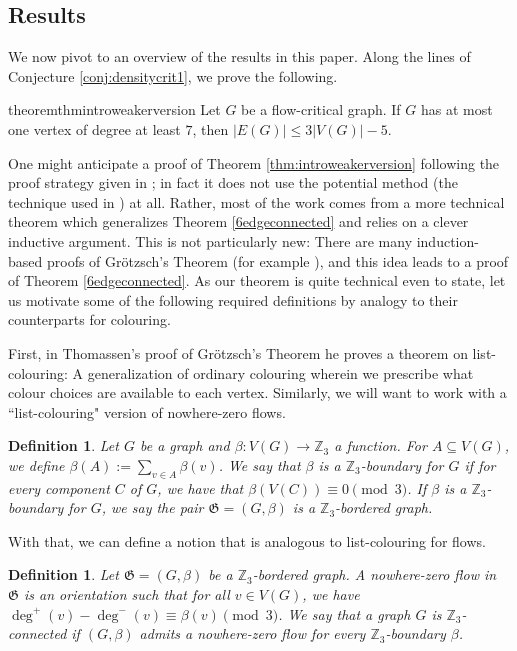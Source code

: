 \documentclass{article}
\newcommand{\Z}{\mathbb{Z}_3}
\newcommand\g{\mathfrak{G}}
\newtheorem{definition}[theorem]{Definition}
\begin{document}
\subsection{Results}\label{subsec:results}
We now pivot to an overview of the results in this paper. Along the lines of Conjecture \ref{conj:densitycrit1}, we prove the following.
\begin{restatable}{theorem}{thmintroweakerversion}\label{thm:introweakerversion}
Let $G$ be a flow-critical graph.  If $G$ has at most one vertex of degree at least $7$,
then $|E(G)|\le 3|V(G)|-5$.
\end{restatable}

 One might anticipate a proof of Theorem \ref{thm:introweakerversion} following the proof strategy given in \cite{Shortproof}; in fact it does not use the potential method (the technique used in \cite{Shortproof}) at all. Rather, most of the work  comes from a more technical theorem which generalizes Theorem \ref{6edgeconnected} and relies on a clever inductive argument. This is not particularly new: There are many induction-based proofs of Grötzsch's Theorem (for example \cite{THOMASSEN2003189}), and this idea leads to a proof of Theorem \ref{6edgeconnected}. As our theorem is quite technical even to state, let us motivate some of the following required definitions by analogy to their counterparts for colouring. 
 
 First, in Thomassen's \cite{THOMASSEN2003189} proof of Grötzsch's Theorem he proves a theorem on list-colouring: A generalization of ordinary colouring wherein we prescribe what colour choices are available to each vertex. Similarly, we will want to work with a ``list-colouring" version of nowhere-zero flows. 

\begin{definition}
Let $G$ be a graph and $\beta:V(G) \rightarrow \Z$ a function.  For $A\subseteq V(G)$, we define
$\beta(A):=\sum_{v\in A} \beta(v)$. We say that $\beta$ is a \emph{$\Z$-boundary} for $G$ if for every component $C$ of $G$, we have that $\beta(V(C)) \equiv 0 \pmod 3$. If $\beta$ is a $\Z$-boundary for $G$, we say the pair $\g = (G,\beta)$ is a \emph{$\Z$-bordered graph}.
\end{definition}

With that, we can define a notion that is analogous to list-colouring for flows.

\begin{definition}
Let $\g = (G,\beta)$ be a $\Z$-bordered graph. A \emph{nowhere-zero flow} in $\g$ is an orientation such that for all $v \in V(G)$, we have $\deg^{+}(v) -\deg^{-}(v) \equiv \beta(v) \pmod 3$.
We say that a graph $G$ is $\Z$-connected if $(G,\beta)$ admits a nowhere-zero flow for every $\Z$-boundary $\beta$.
\end{definition}
\end{document}

